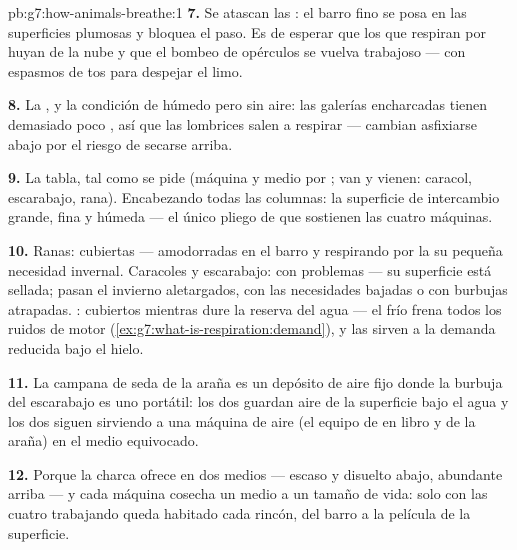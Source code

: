 \begin{solution}{pb:g7:how-animals-breathe:1}
\textbf{7.} Se atascan las : el barro fino se posa en las
superficies plumosas y bloquea el paso. Es de esperar que los que
respiran por  huyan de la nube y que el bombeo de opérculos se
vuelva trabajoso --- con espasmos de tos para despejar el limo.

\textbf{8.} La , y la condición de húmedo pero sin
aire: las galerías encharcadas tienen demasiado poco , así que
las lombrices salen a respirar --- cambian asfixiarse abajo por el
riesgo de secarse arriba.

\textbf{9.} La tabla, tal como se pide (máquina y medio por ; van
y vienen: caracol, escarabajo, rana). Encabezando todas las columnas:
la superficie de intercambio grande, fina y húmeda --- el único pliego
de  que sostienen las cuatro máquinas.

\textbf{10.} Ranas: cubiertas --- amodorradas en el barro y respirando
por la  su pequeña necesidad invernal. Caracoles y escarabajo: con
problemas --- su superficie está sellada; pasan el invierno
aletargados, con las necesidades bajadas o con burbujas atrapadas.
: cubiertos mientras dure la reserva del agua --- el frío frena
todos los ruidos de motor (\cref{ex:g7:what-is-respiration:demand}), y
las  sirven a la demanda reducida bajo el hielo.

\textbf{11.} La campana de seda de la araña es un depósito de aire fijo
donde la burbuja del escarabajo es uno portátil: los dos guardan aire
de la superficie bajo el agua y los dos siguen sirviendo a una máquina
de aire (el equipo de  en libro y  de la araña) en el
medio equivocado.

\textbf{12.} Porque la charca ofrece  en dos medios --- escaso y
disuelto abajo, abundante arriba --- y cada máquina cosecha un medio a
un tamaño de vida: solo con las cuatro trabajando queda habitado cada
rincón, del barro a la película de la superficie.
\end{solution}
